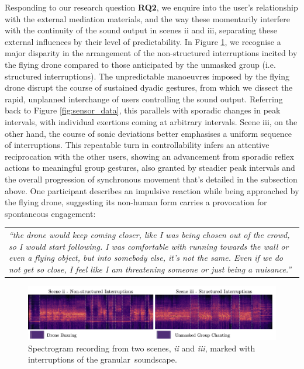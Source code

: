 Responding to our research question \textbf{RQ2}, we enquire into the user's relationship with the external mediation materials, and the way these momentarily interfere with the continuity of the sound output in scenes ii and iii, separating these external influences by their level of predictability. In Figure \ref{fig:interuptions-spectogram}, we recognise a major disparity in the arrangement of the non-structured interruptions incited by the flying drone compared to those anticipated by the unmasked group (i.e. structured interruptions). The unpredictable manoeuvres imposed by the flying drone disrupt the course of sustained dyadic gestures, from which we dissect the rapid, unplanned interchange of users controlling the sound output. Referring back to Figure \ref{fig:sensor_data}, this parallels with sporadic changes in peak intervals, with individual exertions coming at arbitrary intervals. Scene iii, on the other hand, the course of sonic deviations better emphasises a uniform sequence of interruptions. This repeatable turn in controllability infers an attentive reciprocation with the other users, showing an advancement from sporadic reflex actions to meaningful group gestures, also granted by steadier peak intervals and the overall progression of synchronous movement that's detailed in the subsection above. One participant describes an impulsive reaction while being approached by the flying drone, suggesting its non-human form carries a provocation for spontaneous engagement:

\begin{center}
\begin{tabular}{ p{13cm}}
\textit{``the drone would keep coming closer, like I was being chosen out of the crowd, so I would start following. I was comfortable with running towards the wall or even a flying object, but into somebody else, it's not the same. Even if we do not get so close, I feel like I am threatening someone or just being a nuisance.''}
\end{tabular}
\end{center}

\begin{figure}[H]
\centering
\includegraphics[width=\textwidth,keepaspectratio]{Chapters/Figures/adse_ess/interuptions-spectogram-markings-fig.png}
{\caption[Spectrogram recording from two scenes, \textit{ii} and \textit{iii}]{Spectrogram recording from two scenes, \textit{ii} and \textit{iii}, marked with interruptions of the granular~soundscape.}
\label{fig:interuptions-spectogram}}
\end{figure}

